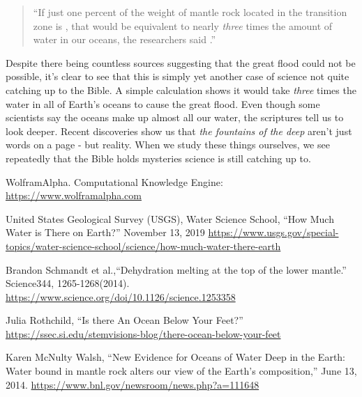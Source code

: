 \documentclass[10pt]{article}
\begin{document}
\begin{multicols}{2}
\begin{quotation}
``If just one percent of the weight of mantle rock located in the transition zone is , that would be equivalent to nearly \textit{three} times the amount of water in our oceans, the researchers said \cite{deep earth water}.''
\end{quotation}

Despite there being countless sources suggesting that the great flood could not be possible, it's clear to see that this is simply yet another case of science not quite catching up to the Bible. A simple calculation shows it would take \textit{three} times the water in all of Earth's oceans to cause the great flood. Even though some scientists say the oceans make up almost all our water, the scriptures tell us to look deeper. Recent discoveries show us that \textit{the fountains of the deep} aren't just words on a page - but reality. When we study these things ourselves, we see repeatedly that the Bible holds mysteries science is still catching up to.




\begin{thebibliography}{9}
	{\footnotesize
		
	 WolframAlpha. Computational Knowledge Engine: \url{https://www.wolframalpha.com}
	
	 United States Geological Survey (USGS), Water Science School, ``How Much Water is There on Earth?'' November 13, 2019  \url{https://www.usgs.gov/special-topics/water-science-school/science/how-much-water-there-earth}
		
	 Brandon Schmandt et al.,``Dehydration melting at the top of the lower mantle.'' Science344, 1265-1268(2014). \url{https://www.science.org/doi/10.1126/science.1253358}
		
	 Julia Rothchild, ``Is there An Ocean Below Your Feet?'' \url{https://ssec.si.edu/stemvisions-blog/there-ocean-below-your-feet}
		
	 Karen McNulty Walsh, ``New Evidence for Oceans of Water Deep in the Earth: Water bound in mantle rock alters our view of the Earth's composition,'' June 13, 2014. \url{https://www.bnl.gov/newsroom/news.php?a=111648}
	
	}
\end{thebibliography}

\end{multicols}


\end{document}
